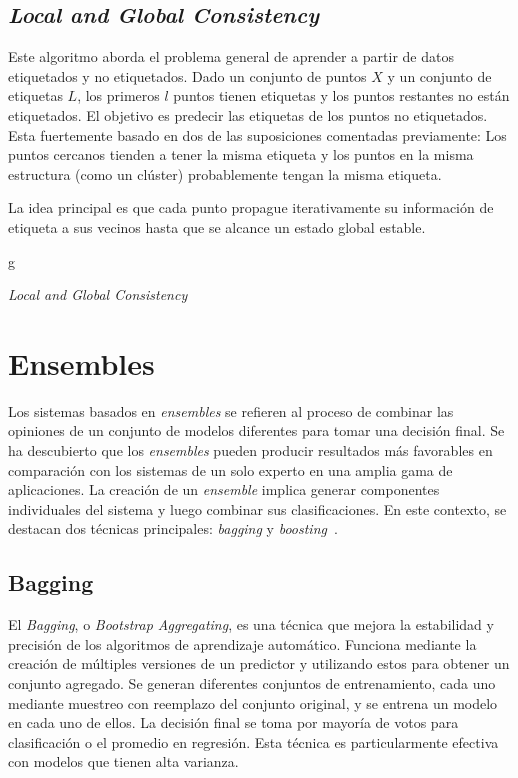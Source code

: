 \subsection{\textit{Local and Global Consistency}} %
Este algoritmo aborda el problema general de aprender a partir de datos etiquetados y no etiquetados. Dado un conjunto de puntos $X$ y un conjunto de etiquetas $L$, los primeros $l$ puntos tienen etiquetas y los puntos restantes no están etiquetados. El objetivo es predecir las etiquetas de los puntos no etiquetados. Esta fuertemente basado en dos de las suposiciones comentadas previamente: Los puntos cercanos tienden a tener la misma etiqueta y
los puntos en la misma estructura (como un clúster) probablemente tengan la misma etiqueta.

La idea principal es que cada punto propague iterativamente su información de etiqueta a sus vecinos hasta que se alcance un estado global estable.

\begin{algorithm}
	\label{alg:LGC}
	\KwIn{}
	\BlankLine
	g\\
	\For{}{
	}{
		
	}
	\caption{\textit{Local and Global Consistency}}
\end{algorithm}

\section{Ensembles}
Los sistemas basados en \textit{ensembles} se refieren al proceso de combinar las opiniones de un conjunto de modelos diferentes para tomar una decisión final. Se ha descubierto que los \textit{ensembles} pueden producir resultados más favorables en comparación con los sistemas de un solo experto en una amplia gama de aplicaciones. La creación de un \textit{ensemble} implica generar componentes individuales del sistema y luego combinar sus clasificaciones. En este contexto, se destacan dos técnicas principales: \textit{bagging} y \textit{boosting}~\cite{ensembles}.

\subsection{Bagging}
El \textit{Bagging}, o \textit{Bootstrap Aggregating}, es una técnica que mejora la estabilidad y precisión de los algoritmos de aprendizaje automático. Funciona mediante la creación de múltiples versiones de un predictor y utilizando estos para obtener un conjunto agregado. Se generan diferentes conjuntos de entrenamiento, cada uno mediante muestreo con reemplazo del conjunto original, y se entrena un modelo en cada uno de ellos. La decisión final se toma por mayoría de votos para clasificación o el promedio en regresión. Esta técnica es particularmente efectiva con modelos que tienen alta varianza.

